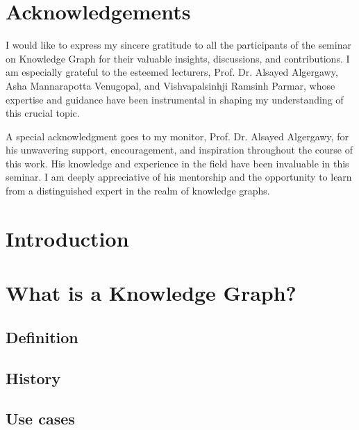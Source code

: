 \documentclass[12pt]{report} %
\begin{document}
\section*{Acknowledgements}
I would like to express my sincere gratitude to all the participants of the seminar on Knowledge Graph for their valuable insights, discussions, and contributions. I am especially grateful to the esteemed lecturers, Prof. Dr. Alsayed Algergawy, Asha Mannarapotta Venugopal, and Vishvapalsinhji Ramsinh Parmar, whose expertise and guidance have been instrumental in shaping my understanding of this crucial topic. 

A special acknowledgment goes to my monitor, Prof. Dr. Alsayed Algergawy, for his unwavering support, encouragement, and inspiration throughout the course of this work. His knowledge and experience in the field have been invaluable in this seminar. I am deeply appreciative of his mentorship and the opportunity to learn from a distinguished expert in the realm of knowledge graphs.

\newpage

\thispagestyle{empty}
\cleardoublepage
\listoffigures
\newpage

\thispagestyle{empty}
\cleardoublepage
\listoftables
\newpage

\mainmatter

\section{Introduction}


\section{What is a Knowledge Graph?}

\subsection{Definition}

\subsection{History}

\subsection{Use cases}
\end{document}
